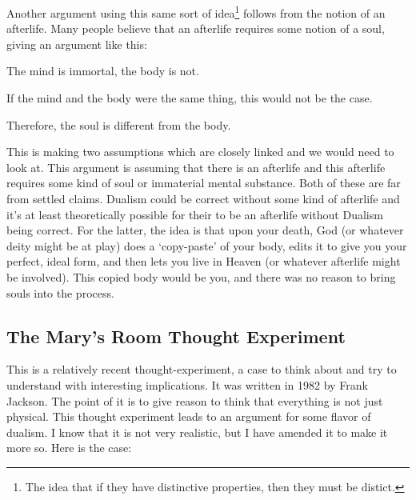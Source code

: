 Another argument using this same sort of idea\footnote{The idea that if they have distinctive properties, then they must be distict.} follows from the notion of an afterlife. Many people believe that an afterlife requires some notion of a soul, giving an argument like this: 

\begin{earg}
    \item[1 ] The mind is immortal, the body is not.
    \item[2 ] If the mind and the body were the same thing, this would not be the case.
    \item[3 ] Therefore, the soul is different from the body.
\end{earg}

This is making two assumptions which are closely linked and we would need to look at. This argument is assuming that there is an afterlife and this afterlife requires some kind of soul or immaterial mental substance. Both of these are far from settled claims. Dualism could be correct without some kind of afterlife and it's at least theoretically possible for their to be an afterlife without Dualism being correct. For the latter, the idea is that upon your death, God (or whatever deity might be at play) does a `copy-paste' of your body, edits it to give you your perfect, ideal form, and then lets you live in Heaven (or whatever afterlife might be involved). This copied body would be you, and there was no reason to bring souls into the process.  

\subsection{The Mary's Room Thought Experiment}

This is a relatively recent thought-experiment, a case to think about and try to understand with interesting implications. It was written in 1982 by Frank Jackson. The point of it is to give reason to think that everything is not just physical. This thought experiment leads to an argument for some flavor of dualism. I know that it is not very realistic, but I have amended it to make it more so. Here is the case:

